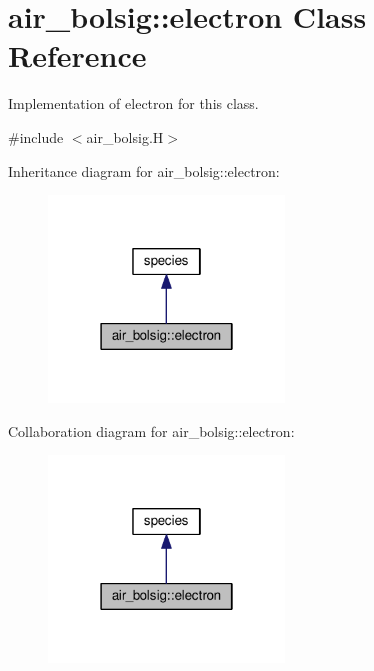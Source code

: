 \hypertarget{classair__bolsig_1_1electron}{}\section{air\+\_\+bolsig\+:\+:electron Class Reference}
\label{classair__bolsig_1_1electron}


Implementation of electron for this class.  




{\ttfamily \#include $<$air\+\_\+bolsig.\+H$>$}



Inheritance diagram for air\+\_\+bolsig\+:\+:electron\+:\nopagebreak
\begin{figure}[H]
\begin{center}
\leavevmode
\includegraphics[width=178pt]{classair__bolsig_1_1electron__inherit__graph}
\end{center}
\end{figure}


Collaboration diagram for air\+\_\+bolsig\+:\+:electron\+:\nopagebreak
\begin{figure}[H]
\begin{center}
\leavevmode
\includegraphics[width=178pt]{classair__bolsig_1_1electron__coll__graph}
\end{center}
\end{figure}
